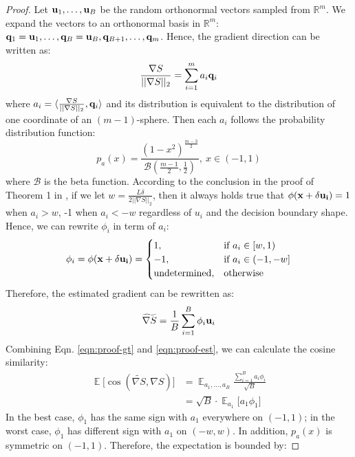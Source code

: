 \label{sec:proof}
\begin{proof}
Let ${\bf u}_1, \ldots, {\bf u}_B$ be the random orthonormal vectors sampled from $\mathbb{R}^m$. We expand the vectors to an orthonormal basis in $\mathbb{R}^m$: ${\bf q}_1={\bf u}_1, \ldots, {\bf q}_B={\bf u}_B, {\bf q}_{B+1}, \ldots, {\bf q}_m$. Hence, the gradient direction can be written as:
\begin{equation}
    \label{eqn:proof-gt}
    \frac{\nabla S}{||\nabla S||_2} = \sum_{i=1}^m a_i{\bf q}_i
\end{equation}
where $a_i=\langle \frac{\nabla S}{||\nabla S||_2}, {\bf q}_i \rangle$ and its distribution is equivalent to the distribution of one coordinate of an $(m-1)$-sphere. Then each $a_i$ follows the probability distribution function:
\begin{equation}
    p_a(x) = \frac{(1-x^2)^{\frac{m-3}2}}{\mathcal{B}(\frac{m-1}2, \frac12)},~x\in(-1,1)
\end{equation}
where $\mathcal{B}$ is the beta function. According to the conclusion in the proof of Theorem 1 in \cite{chen2019hopskipjumpattack}, if we let $w=\frac{L\delta}{2||\nabla S||_2}$, then it always holds true that $\phi({\bf x}+\delta{\bf u_i})=1$ when $a_i>w$, -1 when $a_i<-w$ regardless of $u_i$ and the decision boundary shape. Hence, we can rewrite $\phi_i$ in term of $a_i$:
\begin{equation}
    \phi_i = \phi({\bf x}+\delta{\bf u_i}) =
    \begin{cases}
    1, & \text{if } a_i \in [w, 1)\\
    -1, & \text{if } a_i \in (-1, -w]\\
    \text{undetermined}, & \text{otherwise}
    \end{cases}
\end{equation}
Therefore, the estimated gradient can be rewritten as:
\begin{equation}
    \label{eqn:proof-est}
    \widetilde{\nabla S}=\frac1B\sum_{i=1}^B \phi_i{\bf u}_i
\end{equation}
Combining Eqn. \ref{eqn:proof-gt} and \ref{eqn:proof-est}, we can calculate the cosine similarity:
\begin{align}
    \mathop{\mathbb{E}}\big[ \cos (\widetilde{\nabla S}, \nabla S)\big] &= \mathop{\mathbb{E}}_{a_1, \ldots,a_B}\frac{\sum_{i=1}^Ba_i\phi_i}{\sqrt{B}}\\
    &= \sqrt{B}\cdot \mathop{\mathbb{E}}_{a_1} \big[ a_1\phi_1 \big]
\end{align}
In the best case, $\phi_1$ has the same sign with $a_1$ everywhere on $(-1,1)$; in the worst case, $\phi_1$ has different sign with $a_1$ on $(-w,w)$. In addition, $p_a(x)$ is symmetric on $(-1, 1)$. Therefore, the expectation is bounded by:

\end{proof}
